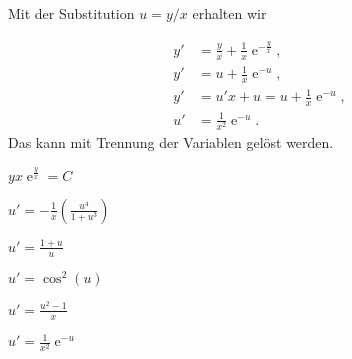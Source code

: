 {\begin{itemize}
\begin{iii}
Mit der Substitution $u=y/x$ erhalten wir

\begin{align*}
y'&=\frac{y}{x} + \frac{1}{x}\operatorname{e}^{-\frac{y}{x}},\\
y'&= u+\frac{1}{x}\operatorname{e}^{-u},\\
y'&= u'x+u = u+\frac{1}{x}\operatorname{e}^{-u},\\
u'&= \frac{1}{x^2}\operatorname{e}^{-u}.
\end{align*}
Das kann mit Trennung der Variablen gelöst werden.

\end{iii}

\end{itemize}
}



{
\begin{iii}
\item $yx\operatorname{e}^\frac{y}{x} = C$
\item $u' = -\frac{1}{x}\left( \frac{u^4}{1+u^3}\right)$
\item $u' = \frac{1+u}{u}$
\item $u' = \cos^2(u)$
\item $u' = \frac{u^2-1}{x}$
\item $u' = \frac{1}{x^2}\operatorname{e}^{-u}$
\end{iii}
}